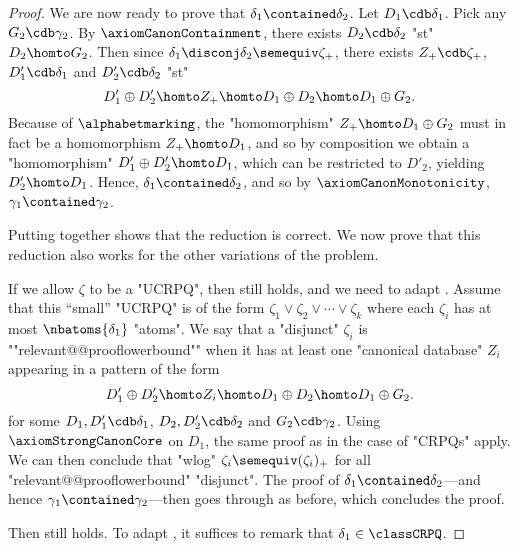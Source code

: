\begin{proof}
	We are now ready to prove that $\delta_1 \contained \delta_2$.
	Let $D_1 \cdb \delta_1$. Pick any $G_2 \cdb \gamma_2$.
	By $\axiomCanonContainment$, there exists $D_2 \cdb \delta_2$ "st" $D_2 \homto G_2$.
	Then since $\delta_1 \disconj \delta_2 \semequiv \zeta_+$,
	there exists $Z_+ \cdb \zeta_+$, $D'_1 \cdb \delta_1$ and $D'_2 \cdb \delta_2$ "st"
	\[
		D'_1 \oplus D'_2
		\homto
		Z_+
		\homto
		D_1 \oplus D_2
		\homto
		D_1 \oplus G_2.
	\]
	Because of $\alphabetmarking$, the "homomorphism" $Z_+ \homto D_1 \oplus G_2$ must in fact be
	a homomorphism $Z_+ \homto D_1$, and so by composition we obtain a "homomorphism"
	$D'_1 \oplus D'_2 \homto D_1$, which can be restricted to $D'_2$, yielding $D'_2 \homto D_1$.
	Hence, $\delta_1 \contained \delta_2$, and so by $\axiomCanonMonotonicity$, $\gamma_1 \contained \gamma_2$.

	Putting 
	together shows that the reduction is correct. We now prove that this reduction also works for the other
	variations of the problem.

	If we allow $\zeta$ to be a "UCRPQ", then  still holds,
	and we need to adapt . Assume that this ``small''
	"UCRPQ" is of the form $\zeta_1 \lor \zeta_2 \lor \cdots \lor \zeta_k$ where each $\zeta_i$ has
	at most $\nbatoms{\delta_1}$ "atoms".
	We say that a "disjunct" $\zeta_i$ is \AP""relevant@@prooflowerbound"" when it has
	at least one "canonical database" $Z_i$ appearing in a pattern of the form
	\[
		D'_1 \oplus D'_2
		\homto
		Z_i
		\homto
		D_1 \oplus D_2
		\homto
		D_1 \oplus G_2.
	\]
	for some $D_1,D'_1 \cdb \delta_1$, $D_2,D'_2 \cdb \delta_2$ and $G_2 \cdb \gamma_2$.
	Using $\axiomStrongCanonCore$ on $D_1$,
	the same proof as in the case of "CRPQs" apply. We can then conclude that "wlog"
	$\zeta_i \semequiv (\zeta_i)_+$ for all "relevant@@prooflowerbound" "disjunct".
	The proof of $\delta_1 \contained \delta_2$---and hence $\gamma_1 \contained \gamma_2$---then goes through as before,
	which concludes the proof.

	Then  still holds.
	To adapt , it suffices to remark that
	$\delta_1 \in \classCRPQ$.
\end{proof}

